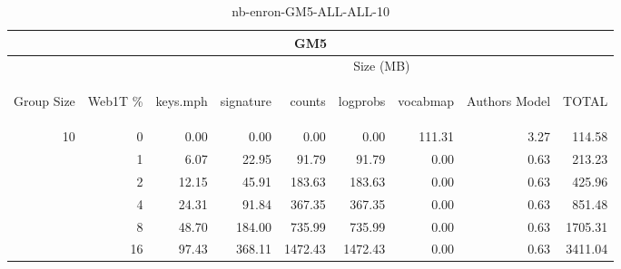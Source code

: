 \begin{center}
\begin{table}[htbp]
\begin{tabular}{ | r | r | r | r | r | r | r | r | r |}
\hline
\multicolumn{9}{|c|}{GM5}\\
\hline
 & & \multicolumn{7}{|c|}{Size (MB)}\\ \cline{3-9}
\begin{sideways}Group Size\end{sideways} & \begin{sideways}Web1T \% \end{sideways} & \begin{sideways}keys.mph\end{sideways} & \begin{sideways}signature\end{sideways} & \begin{sideways}counts\end{sideways} & \begin{sideways}logprobs\end{sideways} & \begin{sideways}vocabmap\end{sideways} & \begin{sideways}Authors Model \end{sideways} & \begin{sideways}TOTAL\end{sideways}\\
\hline
\multirow{5}{*}{10}
 & 0 & 0.00 & 0.00 & 0.00 & 0.00 & 111.31 & 3.27 & 114.58\\ \cline{2-9}
 & 1 & 6.07 & 22.95 & 91.79 & 91.79 & 0.00 & 0.63 & 213.23\\ \cline{2-9}
 & 2 & 12.15 & 45.91 & 183.63 & 183.63 & 0.00 & 0.63 & 425.96\\ \cline{2-9}
 & 4 & 24.31 & 91.84 & 367.35 & 367.35 & 0.00 & 0.63 & 851.48\\ \cline{2-9}
 & 8 & 48.70 & 184.00 & 735.99 & 735.99 & 0.00 & 0.63 & 1705.31\\ \cline{2-9}
 & 16 & 97.43 & 368.11 & 1472.43 & 1472.43 & 0.00 & 0.63 & 3411.04\\ \cline{2-9}
\hline
\end{tabular}
\caption{nb-enron-GM5-ALL-ALL-10}
\label{table:nb-enron-GM5-ALL-ALL-10}
\end{table}
\end{center}

